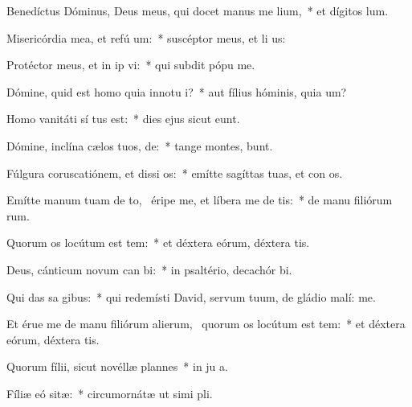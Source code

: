 \item Benedíctus Dóminus, Deus meus, qui docet manus me  lium,~* et dígitos   lum.
\item Misericórdia mea, et refú um:~* suscéptor meus, et li us:
\item Protéctor meus, et in ip vi:~* qui subdit pópu   me.
\item Dómine, quid est homo quia innotu i?~* aut fílius hóminis, quia  um?
\item Homo vanitáti sí tus est:~* dies ejus sicut  eunt.
\item Dómine, inclína cælos tuos,  de:~* tange montes,  bunt.
\item Fúlgura coruscatiónem, et dissi os:~* emítte sagíttas tuas, et con os.
\item Emítte manum tuam de to,~\pscross{} éripe me, et líbera me de  tis:~* de manu filiórum rum.
\item Quorum os locútum est tem:~* et déxtera eórum, déxtera tis.
\item Deus, cánticum novum can bi:~* in psaltério, decachór  bi.
\item Qui das sa gibus:~* qui redemísti David, servum tuum, de gládio malí:  me.
\item Et érue me de manu filiórum alierum,~\pscross{} quorum os locútum est tem:~* et déxtera eórum, déxtera tis.
\item Quorum fílii, sicut novéllæ plannes~* in ju a.
\item Fíliæ eó sitæ:~* circumornátæ ut simi pli.
